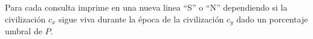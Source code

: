 \outputText

Para cada consulta imprime en una nueva linea ``S'' o ``N'' dependiendo si la civilización $c_x$ sigue viva durante la época de la civilización $c_y$ dado un porcentaje umbral de $P$.

\exampleCases

\begin{example}
\end{example}

